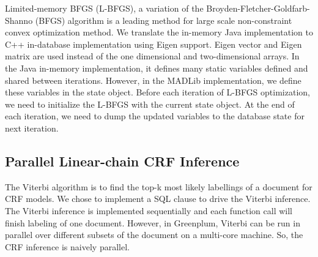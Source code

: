 \documentclass[11pt,letterpaper]{article}
\begin{document}
Limited-memory BFGS (L-BFGS), a variation of the Broyden-Fletcher-Goldfarb-Shanno (BFGS)
algorithm is a leading method for large scale non-constraint convex optimization method.
We translate the in-memory Java implementation to C++ in-database implementation using Eigen support.
Eigen vector and Eigen matrix are used instead of the one dimensional and two-dimensional arrays.
In the Java in-memory implementation, it defines many static variables defined and shared between iterations.
However, in the MADLib implementation, we define these variables in the state object.
Before each iteration of L-BFGS optimization, we need to initialize the L-BFGS with the current state object. 
At the end of each iteration, we need to dump the updated variables to the database state for next iteration.




\subsection{Parallel Linear-chain CRF Inference}
 The Viterbi algorithm is to find the top-k most likely labellings of a document 
for CRF models. 
We chose to implement a SQL clause to drive the Viterbi inference. 
The Viterbi inference is implemented sequentially and each function call 
will finish labeling of one document.
However, in Greenplum, Viterbi can be run in parallel over different subsets 
of the document on a multi-core machine. So, the CRF inference is naively parallel. 

\end{document}
